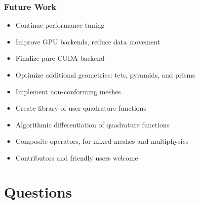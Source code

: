 \documentclass{beamer}
\begin{document}
\begin{frame}
\begin{center}
\frametitle{Future Work}

\begin{itemize}

\item Continue performance tuning\\

\item Improve GPU backends, reduce data movement\\

\item Finalize pure CUDA backend\\

\item Optimize additional geometries: tets, pyramids, and prisms\\

\item Implement non-conforming meshes\\

\item Create library of user quadrature functions\\

\item Algorithmic differentiation of quadrature functions\\

\item Composite operators, for mixed meshes and multiphysics\\

\item Contributors and friendly users welcome

\end{itemize}

\end{center}
\end{frame}

\section{Questions}
\end{document}
